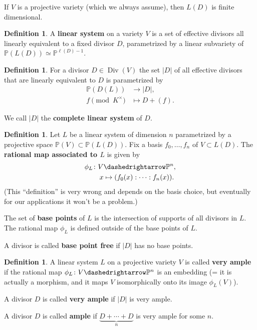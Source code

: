 \documentclass{article}
\theoremstyle{definition}
\newtheorem{definition}[proposition]{Definition}
\DeclareMathOperator{\Div}{Div}
\newcommand{\isom}{\simeq}
\newcommand{\term}{\textbf}
\newcommand{\PP}{\mathbb{P}}
\begin{document}
If $V$ is a projective variety (which we always assume), then $L (D)$ is finite
dimensional.

\begin{definition}
  A \term{linear system} on a variety $V$ is a set of effective divisors all
  linearly equivalent to a fixed divisor $D$, parametrized by a linear
  subvariety of $\PP (L (D)) \isom \PP^{\ell (D) - 1}$.
\end{definition}

\begin{definition}
  For a divisor $D \in \Div (V)$ the set $|D|$ of all effective divisors that
  are linearly equivalent to $D$ is parametrized by
  \begin{align*}
    \PP (D (L)) & \to |D|,\\
    f \pmod{K^\times} & \mapsto D + (f).
  \end{align*}

  We call $|D|$ the \term{complete linear system} of $D$.
\end{definition}

\begin{definition}
  \label{definition:rational-map-for-a-linear-system}
  Let $L$ be a linear system of dimension $n$ parametrized by a projective space
  $\PP (V) \subset \PP (L (D))$. Fix a basis $f_0, \ldots, f_n$ of
  $V \subset L (D)$. The \term{rational map associated to $L$} is given by
  \begin{align*}
    \phi_L\colon V & \dashedrightarrow \PP^n,\\
    x & \mapsto (f_0 (x) : \cdots : f_n (x)).
  \end{align*}
  (This ``definition'' is very wrong and depends on the basis choice, but
  eventually for our applications it won't be a problem.)

  The set of \term{base points} of $L$ is the intersection of supports of all
  divisors in $L$. The rational map $\phi_L$ is defined outside of the base
  points of $L$.

  A divisor is called \term{base point free} if $|D|$ has no base points.
\end{definition}

\begin{definition}
  A linear system $L$ on a projective variety $V$ is called \term{very ample} if
  the rational map $\phi_L\colon V \dashedrightarrow \PP^n$ is an embedding
  (= it is actually a morphism, and it maps $V$ isomorphically onto its image
  $\phi_L (V)$).

  A divisor $D$ is called \term{very ample} if $|D|$ is very ample.

  A divisor $D$ is called \term{ample} if $\underbrace{D+\cdots+D}_n$ is very
  ample for some $n$.
\end{definition}
\end{document}
